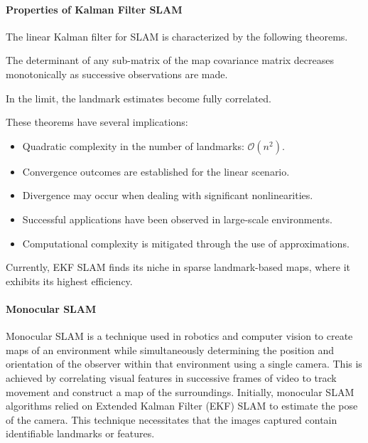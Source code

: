 \paragraph*{Properties of Kalman Filter SLAM}
The linear Kalman filter for SLAM is characterized by the following theorems.
\begin{theorem}
    The determinant of any sub-matrix of the map covariance matrix decreases monotonically as successive observations are made.
\end{theorem}
\begin{theorem}
    In the limit, the landmark estimates become fully correlated.
\end{theorem}
These theorems have several implications:
\begin{itemize}
    \item Quadratic complexity in the number of landmarks: $\mathcal{O}(n^2)$.
    \item Convergence outcomes are established for the linear scenario.
    \item Divergence may occur when dealing with significant nonlinearities.
    \item Successful applications have been observed in large-scale environments.
    \item Computational complexity is mitigated through the use of approximations.
\end{itemize}
Currently, EKF SLAM finds its niche in sparse landmark-based maps, where it exhibits its highest efficiency.

\paragraph*{Monocular SLAM}
Monocular SLAM is a technique used in robotics and computer vision to create maps of an environment while simultaneously determining the position and orientation of the observer within that environment using a single camera.
This is achieved by correlating visual features in successive frames of video to track movement and construct a map of the surroundings.
Initially, monocular SLAM algorithms relied on Extended Kalman Filter (EKF) SLAM to estimate the pose of the camera. 
This technique necessitates that the images captured contain identifiable landmarks or features.

